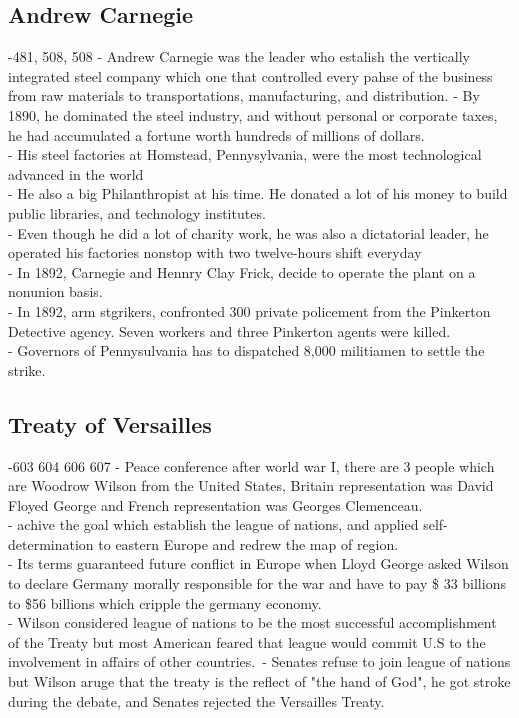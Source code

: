 \documentclass{article}
\begin{document}
\subsection{ Andrew Carnegie}
-481, 508, 508
- Andrew Carnegie was the leader who estalish the vertically integrated steel company which one that controlled every pahse of the business from raw materials to transportations, manufacturing, and distribution.
- By 1890, he dominated the steel industry, and without personal or corporate taxes, he had accumulated a fortune worth hundreds of millions of dollars. \\
- His steel factories at Homstead, Pennysylvania, were the most technological advanced in the world\\
- He also a big Philanthropist at his time. He donated a lot of his money to build public libraries, and technology institutes.\\
- Even though he did a lot of charity work, he was also a dictatorial leader, he operated his factories nonstop with two twelve-hours shift everyday\\
- In 1892, Carnegie and Hennry Clay Frick, decide to operate the plant on a nonunion basis. \\
- In 1892, arm stgrikers, confronted 300 private policement from the Pinkerton Detective agency. Seven workers and three Pinkerton agents were killed.\\
- Governors of Pennysulvania has to dispatched 8,000 militiamen to settle the strike.\\ 

\subsection{ Treaty of Versailles}
-603 604 606 607
- Peace conference after world war I, there are 3 people which are Woodrow Wilson from the United States, Britain representation was David Floyed George and French representation was Georges Clemenceau.\\
- achive the goal which establish the league of nations, and applied self-determination to eastern Europe and redrew the map of region.\\
- Its terms guaranteed future conflict in Europe when Lloyd George asked Wilson to declare Germany morally responsible for the war and have to pay \$ 33 billions to \$56 billions which cripple the germany economy.\\
- Wilson considered league of nations to be the most successful accomplishment of the Treaty but most American feared that league would commit U.S to the involvement in affairs of other countries.\
- Senates refuse to join league of nations but Wilson aruge that the treaty is the reflect of "the hand of God", he got stroke during the debate, and Senates rejected the Versailles Treaty.\\
\end{document}
